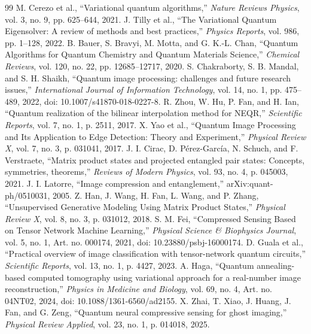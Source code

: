 \documentclass[journal]{IEEEtran}
\begin{document}
\begin{thebibliography}{99}
 M. Cerezo et al., ``Variational quantum algorithms,'' \textit{Nature Reviews Physics}, vol. 3, no. 9, pp. 625--644, 2021.
 J. Tilly et al., ``The Variational Quantum Eigensolver: A review of methods and best practices,'' \textit{Physics Reports}, vol. 986, pp. 1--128, 2022.
 B. Bauer, S. Bravyi, M. Motta, and G. K.-L. Chan, ``Quantum Algorithms for Quantum Chemistry and Quantum Materials Science,'' \textit{Chemical Reviews}, vol. 120, no. 22, pp. 12685--12717, 2020.
 S. Chakraborty, S. B. Mandal, and S. H. Shaikh, ``Quantum image processing: challenges and future research issues,'' \textit{International Journal of Information Technology}, vol. 14, no. 1, pp. 475--489, 2022, doi: 10.1007/s41870-018-0227-8.
 R. Zhou, W. Hu, P. Fan, and H. Ian, ``Quantum realization of the bilinear interpolation method for NEQR,'' \textit{Scientific Reports}, vol. 7, no. 1, p. 2511, 2017.
 X. Yao et al., ``Quantum Image Processing and Its Application to Edge Detection: Theory and Experiment,'' \textit{Physical Review X}, vol. 7, no. 3, p. 031041, 2017.
 J. I. Cirac, D. Pérez-García, N. Schuch, and F. Verstraete, ``Matrix product states and projected entangled pair states: Concepts, symmetries, theorems,'' \textit{Reviews of Modern Physics}, vol. 93, no. 4, p. 045003, 2021.
 J. I. Latorre, ``Image compression and entanglement,'' arXiv:quant-ph/0510031, 2005.
 Z. Han, J. Wang, H. Fan, L. Wang, and P. Zhang, ``Unsupervised Generative Modeling Using Matrix Product States,'' \textit{Physical Review X}, vol. 8, no. 3, p. 031012, 2018.
 S. M. Fei, ``Compressed Sensing Based on Tensor Network Machine Learning,'' \textit{Physical Science \& Biophysics Journal}, vol. 5, no. 1, Art. no. 000174, 2021, doi: 10.23880/psbj-16000174.
 D. Guala et al., ``Practical overview of image classification with tensor-network quantum circuits,'' \textit{Scientific Reports}, vol. 13, no. 1, p. 4427, 2023.
 A. Haga, ``Quantum annealing-based computed tomography using variational approach for a real-number image reconstruction,'' \textit{Physics in Medicine and Biology}, vol. 69, no. 4, Art. no. 04NT02, 2024, doi: 10.1088/1361-6560/ad2155.
 X. Zhai, T. Xiao, J. Huang, J. Fan, and G. Zeng, ``Quantum neural compressive sensing for ghost imaging,'' \textit{Physical Review Applied}, vol. 23, no. 1, p. 014018, 2025.

\end{thebibliography}
\end{document}

